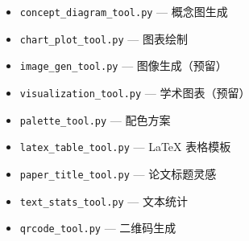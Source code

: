 \begin{itemize}[leftmargin=2em]
    \item \texttt{concept\_diagram\_tool.py} — 概念图生成
    \item \texttt{chart\_plot\_tool.py} — 图表绘制
    \item \texttt{image\_gen\_tool.py} — 图像生成（预留）
    \item \texttt{visualization\_tool.py} — 学术图表（预留）
    \item \texttt{palette\_tool.py} — 配色方案
    \item \texttt{latex\_table\_tool.py} — LaTeX 表格模板
    \item \texttt{paper\_title\_tool.py} — 论文标题灵感
    \item \texttt{text\_stats\_tool.py} — 文本统计
    \item \texttt{qrcode\_tool.py} — 二维码生成
\end{itemize}
